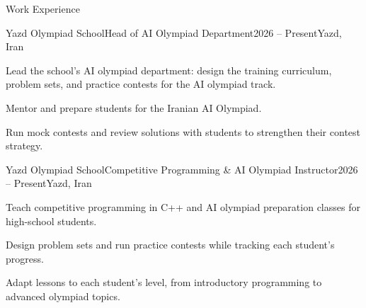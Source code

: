 \begin{section}{Work Experience}

    \begin{subsection}{Yazd Olympiad School}{Head of AI Olympiad Department}{2026 -- Present}{Yazd, Iran}
    \item Lead the school's AI olympiad department: design the training curriculum, problem sets, and practice contests for the AI olympiad track.
    \item Mentor and prepare students for the Iranian AI Olympiad.
    \item Run mock contests and review solutions with students to strengthen their contest strategy.
    \end{subsection}

    \begin{subsection}{Yazd Olympiad School}{Competitive Programming \& AI Olympiad Instructor}{2026 -- Present}{Yazd, Iran}
    \item Teach competitive programming in C++ and AI olympiad preparation classes for high-school students.
    \item Design problem sets and run practice contests while tracking each student's progress.
    \item Adapt lessons to each student's level, from introductory programming to advanced olympiad topics.
    \end{subsection}

\end{section}
